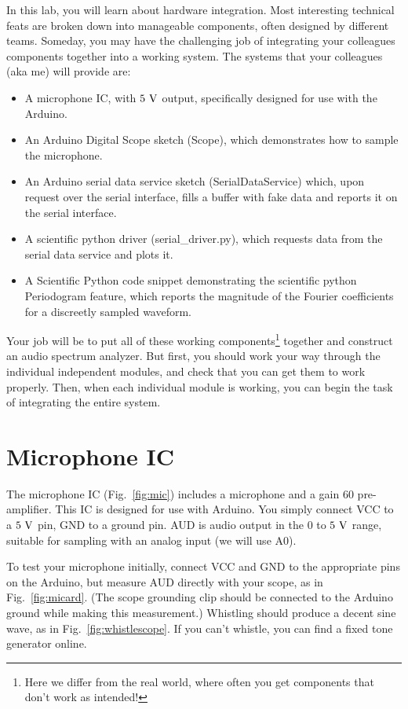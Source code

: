 \documentclass[12pt]{article}
\begin{document}
In this lab, you will learn about hardware integration.  Most interesting technical feats are broken down into manageable components, often designed by different teams.  Someday, you may have the challenging job of integrating your colleagues components together into a working system.   The systems that your colleagues (aka me) will provide are:
\begin{itemize}
\item A microphone IC, with $5~\rm V$ output, specifically designed for use with the Arduino.
\item An Arduino Digital Scope sketch (Scope), which demonstrates how to sample the microphone.
\item An Arduino serial data service sketch (SerialDataService) which, upon request over the serial interface, fills a buffer with fake data and reports it on the serial interface.
\item A scientific python driver (serial\_driver.py), which requests data from the serial data service and plots it.
\item A Scientific Python code snippet demonstrating the scientific python Periodogram feature, which reports the magnitude of the Fourier coefficients for a discreetly sampled waveform.
\end{itemize}

Your job will be to put all of these working components\footnote{Here we differ from the real world, where often you get components that don't work as intended!} together and construct an audio spectrum analyzer. 
But first, you should work your way through the individual independent modules, and check that you can get them to work properly.  Then, when each individual module is working, you can begin the task of integrating the entire system.

\section{Microphone IC}

The microphone IC (Fig.~\ref{fig:mic}) includes a microphone and a gain 60 pre-amplifier.  This IC is designed for use with Arduino.  You simply connect VCC to a $5~\rm V$ pin, GND to a ground pin.  AUD is audio output in the $0$ to $5~\rm V$ range, suitable for sampling with an analog input (we will use A0).

To test your microphone initially, connect VCC and GND to the appropriate pins on the Arduino, but measure AUD  directly with your scope, as in Fig.~\ref{fig:micard}.  (The scope grounding clip should be connected to the Arduino ground while making this measurement.)  Whistling should produce a decent sine wave, as in Fig.~\ref{fig:whistlescope}.  If you can't whistle, you can find a fixed tone generator online.
\end{document}
